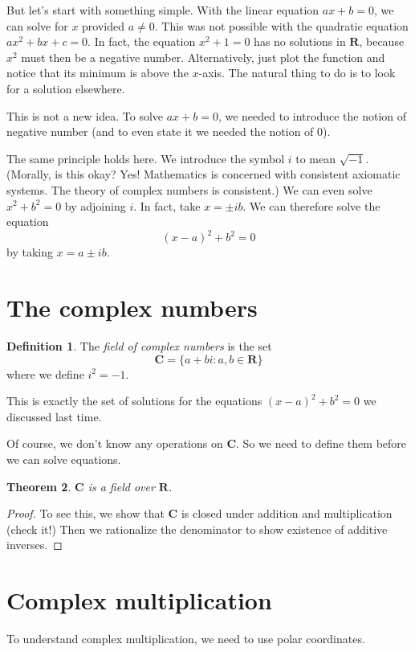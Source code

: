 \documentclass[12pt]{report}
\newcommand{\RR}{\mathbf{R}}
\newcommand{\CC}{\mathbf{C}}
\newcommand{\dfn}[1]{\emph{#1}\index{#1}}
\newtheorem{theorem}{Theorem}[chapter]
\theoremstyle{definition}
\newtheorem{definition}[theorem]{Definition}
\theoremstyle{remark}
\begin{document}
But let's start with something simple. With the linear equation $ax + b = 0$, we can solve for $x$ provided $a \neq 0$. This was not possible with the quadratic equation $ax^2 + bx + c = 0$. In fact, the equation $x^2 + 1 = 0$ has no solutions in $\RR$, because $x^2$ must then be a negative number. Alternatively, just plot the function and notice that its minimum is above the $x$-axis. The natural thing to do is to look for a solution elsewhere.

This is not a new idea. To solve $ax + b = 0$, we needed to introduce the notion of negative number (and to even state it we needed the notion of $0$).

The same principle holds here. We introduce the symbol $i$ to mean $\sqrt{-1}$. (Morally, is this okay? Yes! Mathematics is concerned with consistent axiomatic systems. The theory of complex numbers is consistent.) We can even solve $x^2 + b^2 = 0$ by adjoining $i$. In fact, take $x = \pm ib$. We can therefore solve the equation
$$(x - a)^2 + b^2 = 0$$
by taking $x = a \pm ib$.

\section{The complex numbers}
\begin{definition}
The \dfn{field of complex numbers} is the set
$$\CC = \{a + bi: a, b \in \RR\}
$$
where we define $i^2 = -1$.
\end{definition}
This is exactly the set of solutions for the equations $(x - a)^2 + b^2 = 0$ we discussed last time.

Of course, we don't know any operations on $\CC$. So we need to define them before we can solve equations.
\begin{theorem}
$\CC$ is a field over $\RR$.
\end{theorem}
\begin{proof}
To see this, we show that $\CC$ is closed under addition and multiplication (check it!) Then we rationalize the denominator to show existence of additive inverses.
\end{proof}

\section{Complex multiplication}
To understand complex multiplication, we need to use polar coordinates.
\end{document}
